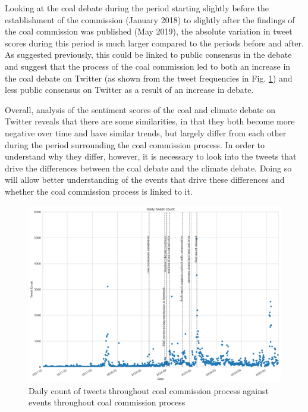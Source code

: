 \documentclass[12pt,onecolumn,twoside]{layout}
\begin{document}
Looking at the coal debate during the period starting slightly before the establishment of the commission (January 2018) to slightly after the findings of the coal commission was published (May 2019), the absolute variation in tweet scores during this period is much larger compared to the periods before and after. As suggested previously, this could be linked to public consensus in the debate and suggest that the process of the coal commission led to both an increase in the coal debate on Twitter (as shown from the tweet frequencies in Fig. \ref{fig:tweet_count_event_timeline}) and less public consensus on Twitter as a result of an increase in debate. 

Overall, analysis of the sentiment scores of the coal and climate debate on Twitter reveals that there are some similarities, in that they both become more negative over time and have similar trends, but largely differ from each other during the period surrounding the coal commission process. In order to understand why they differ, however, it is necessary to look into the tweets that drive the differences between the coal debate and the climate debate. Doing so will allow better understanding of the events that drive these differences and whether the coal commission process is linked to it. 

\begin{figure}
	\begin{center}
		\includegraphics[width=\textwidth]{figures/sa_tweet_count_event_timeline3}
	\end{center}
	\caption{Daily count of tweets throughout coal commission process against events throughout coal commission process}
	\label{fig:tweet_count_event_timeline}
\end{figure}
\end{document}

